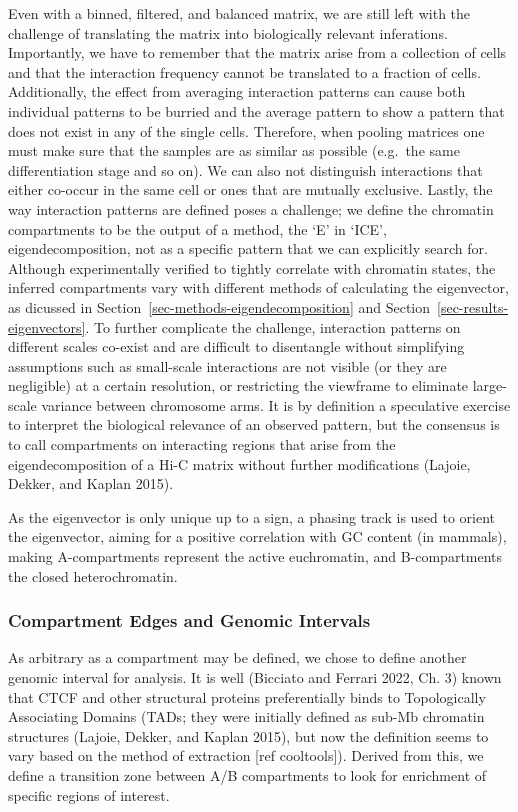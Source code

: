 \documentclass[
  11pt,
  a4paper,
]{scrbook}
\begin{document}
Even with a binned, filtered, and balanced matrix, we are still left
with the challenge of translating the matrix into biologically relevant
inferations. Importantly, we have to remember that the matrix arise from
a collection of cells and that the interaction frequency cannot be
translated to a fraction of cells. Additionally, the effect from
averaging interaction patterns can cause both individual patterns to be
burried and the average pattern to show a pattern that does not exist in
any of the single cells. Therefore, when pooling matrices one must make
sure that the samples are as similar as possible (e.g.~the same
differentiation stage and so on). We can also not distinguish
interactions that either co-occur in the same cell or ones that are
mutually exclusive. Lastly, the way interaction patterns are defined
poses a challenge; we define the chromatin compartments to be the output
of a method, the `E' in `ICE', eigendecomposition, not as a specific
pattern that we can explicitly search for. Although experimentally
verified to tightly correlate with chromatin states, the inferred
compartments vary with different methods of calculating the eigenvector,
as dicussed in Section~\ref{sec-methods-eigendecomposition} and
Section~\ref{sec-results-eigenvectors}. To further complicate the
challenge, interaction patterns on different scales co-exist and are
difficult to disentangle without simplifying assumptions such as
small-scale interactions are not visible (or they are negligible) at a
certain resolution, or restricting the viewframe to eliminate
large-scale variance between chromosome arms. It is by definition a
speculative exercise to interpret the biological relevance of an
observed pattern, but the consensus is to call compartments on
interacting regions that arise from the eigendecomposition of a Hi-C
matrix without further modifications (Lajoie, Dekker, and Kaplan 2015).

As the eigenvector is only unique up to a sign, a phasing track is used
to orient the eigenvector, aiming for a positive correlation with GC
content (in mammals), making A-compartments represent the active
euchromatin, and B-compartments the closed heterochromatin.

\subsubsection{Compartment Edges and Genomic
Intervals}\label{compartment-edges-and-genomic-intervals}

As arbitrary as a compartment may be defined, we chose to define another
genomic interval for analysis. It is well (Bicciato and Ferrari 2022,
Ch. 3) known that CTCF and other structural proteins preferentially
binds to Topologically Associating Domains (TADs; they were initially
defined as sub-Mb chromatin structures (Lajoie, Dekker, and Kaplan
2015), but now the definition seems to vary based on the method of
extraction {[}ref cooltools{]}). Derived from this, we define a
transition zone between A/B compartments to look for enrichment of
specific regions of interest.
\end{document}
